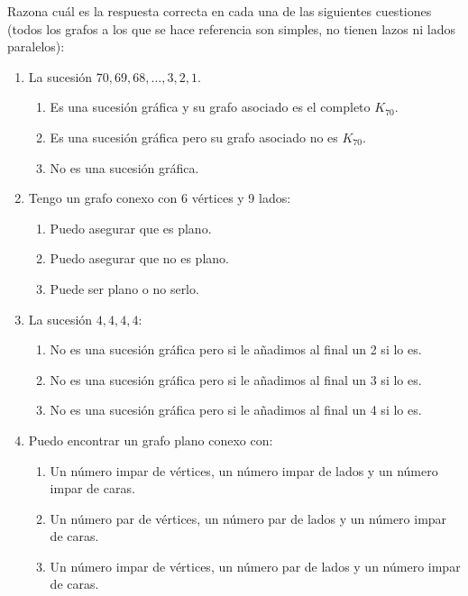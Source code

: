 \begin{ejercicio}\label{ej:1.31}
    Razona cuál es la respuesta correcta en cada una de las siguientes cuestiones (todos los grafos a los que se hace referencia son simples, no tienen lazos ni lados paralelos):
    \begin{enumerate}
        \item La sucesión $70, 69, 68, \ldots, 3, 2, 1$.
        \begin{enumerate}
            \item Es una sucesión gráfica y su grafo asociado es el completo $K_{70}$.
            \item Es una sucesión gráfica pero su grafo asociado no es $K_{70}$.
            \item No es una sucesión gráfica.
        \end{enumerate}
        \item Tengo un grafo conexo con 6 vértices y 9 lados:
        \begin{enumerate}
            \item Puedo asegurar que es plano.
            \item Puedo asegurar que no es plano.
            \item Puede ser plano o no serlo.
        \end{enumerate}
        \item La sucesión $4, 4, 4, 4$:
        \begin{enumerate}
            \item No es una sucesión gráfica pero si le añadimos al final un 2 si lo es.
            \item No es una sucesión gráfica pero si le añadimos al final un 3 si lo es.
            \item No es una sucesión gráfica pero si le añadimos al final un 4 si lo es.
        \end{enumerate}
        \item Puedo encontrar un grafo plano conexo con:
        \begin{enumerate}
            \item Un número impar de vértices, un número impar de lados y un número impar de caras.
            \item Un número par de vértices, un número par de lados y un número impar de caras.
            \item Un número impar de vértices, un número par de lados y un número impar de caras.
        \end{enumerate}

\end{enumerate}
\end{ejercicio}
